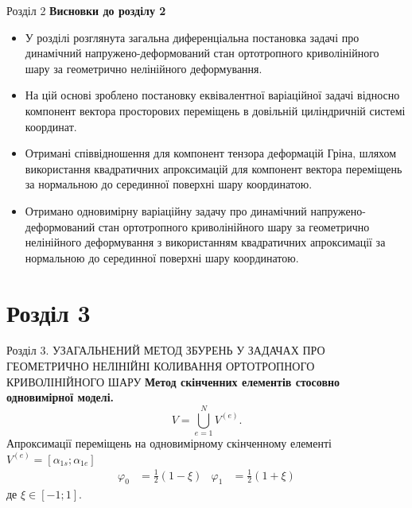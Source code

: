\documentclass[8pt]{beamer}
\numberwithin{figure}{section}
\numberwithin{equation}{section}
\numberwithin{table}{section}
\begin{document}
\begin{frame}{Розділ 2}
\textbf{Висновки до розділу 2}\\
\vspace{1em}
\begin{itemize}
\item У розділі розглянута загальна диференціальна постановка задачі про динамічний напружено-деформований стан ортотропного криволінійного шару за геометрично нелінійного деформування.
\item На цій основі зроблено постановку еквівалентної варіаційної задачі відносно компонент вектора просторових переміщень в довільній циліндричній системі координат.
\item Отримані співвідношення для компонент тензора деформацій Гріна, шляхом використання квадратичних апроксимацій для компонент вектора переміщень за нормальною до серединної поверхні шару координатою.
\item Отримано одновимірну варіаційну задачу про динамічний напружено-деформований стан ортотропного криволінійного шару за геометрично нелінійного деформування з використанням квадратичних апроксимації за нормальною до серединної поверхні шару координатою. 
\end{itemize}

\end{frame}

\section{Розділ 3}
\begin{frame}{Розділ 3. УЗАГАЛЬНЕНИЙ МЕТОД ЗБУРЕНЬ У ЗАДАЧАХ ПРО ГЕОМЕТРИЧНО НЕЛІНІЙНІ КОЛИВАННЯ ОРТОТРОПНОГО КРИВОЛІНІЙНОГО ШАРУ}
\textbf{Метод скінченних елементів стосовно одновимірної моделі.}
\\
\vspace{1em}
\begin{equation}
V=\bigcup\limits_{e=1}^{N} V^{(e)}.
\end{equation}
Апроксимації переміщень на одновимірному скінченному елементі $V^{(e)} = [\alpha_{1s};\alpha_{1e}]$
\begin{equation}
\begin{aligned}
\varphi_0&=\frac{1}{2}\left(1-\xi\right) & \varphi_1 &=\frac{1}{2}\left(1+\xi\right)
\end{aligned}
\end{equation}
де $\xi \in [-1;1]$.
\end{frame}
\end{document}
